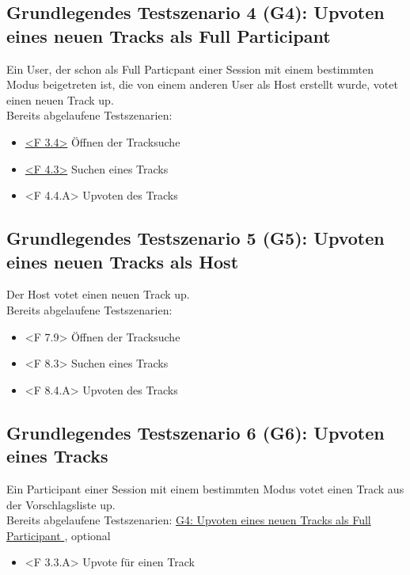 \documentclass[oneside, ngerman]{sdqtechreport}
\begin{document}
\subsection{Grundlegendes Testszenario 4 (G4): Upvoten eines neuen Tracks als Full Participant}
\label{subsec:Tests:GrundlegendeTestszenarien:G4}
\hypertarget{G4}{}
\newcommand{\gFour}{\hyperlink{G4}{G4: Upvoten eines neuen Tracks als Full Participant }}
Ein User, der schon als Full Particpant einer Session mit einem bestimmten Modus beigetreten ist, die von einem anderen User als Host erstellt wurde, votet einen neuen Track up. \\
Bereits abgelaufene Testszenarien: \gTwo
\begin{itemize}
    \item \hyperlink{<F 3.4>}{<F 3.4>} Öffnen der Tracksuche
    \item \hyperlink{<F 4.3>}{<F 4.3>} Suchen eines Tracks
    \item <F 4.4.A> Upvoten des Tracks
\end{itemize}

\subsection{Grundlegendes Testszenario 5 (G5): Upvoten eines neuen Tracks als Host}
\label{subsec:Tests:GrundlegendeTestszenarien:G5}
\hypertarget{G5}{}
\newcommand{\gFive}{\hyperlink{G5}{G5: Upvoten eines neuen Tracks als Host }}
Der Host votet einen neuen Track up. \\
Bereits abgelaufene Testszenarien: \gOne
\begin{itemize}
    \item <F 7.9> Öffnen der Tracksuche
    \item <F 8.3> Suchen eines Tracks
    \item <F 8.4.A> Upvoten des Tracks
\end{itemize}

\subsection{Grundlegendes Testszenario 6 (G6): Upvoten eines Tracks}
\label{subsec:Tests:GrundlegendeTestszenarien:G6}
\hypertarget{G6}{}
\newcommand{\gSix}{\hyperlink{G6}{G6: Upvoten eines Tracks }}
Ein Participant einer Session mit einem bestimmten Modus votet einen Track aus der Vorschlagsliste up. \\
Bereits abgelaufene Testszenarien: \gFour, optional \gThree
\begin{itemize}
    \item <F 3.3.A> Upvote für einen Track
\end{itemize}
\end{document}
